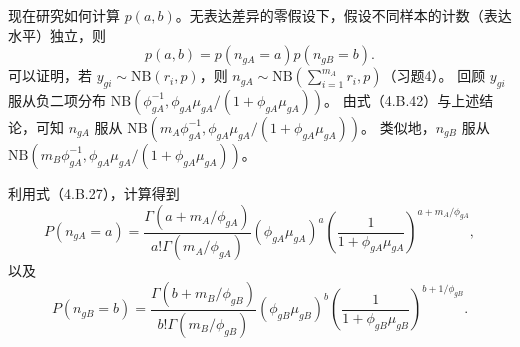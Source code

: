 现在研究如何计算 $p(a,b)$。无表达差异的零假设下，假设不同样本的计数（表达水平）独立，则
\[
p(a,b)=p(n_{gA}=a)p(n_{gB}=b).
\]
可以证明，若 $y_{gi}\sim\mathrm{NB}(r_i,p)$，则
$n_{gA}\sim\mathrm{NB}(\sum_{i=1}^{m_A}r_i,p)$（习题4）。
回顾 $y_{gi}$ 服从负二项分布
$\mathrm{NB}(\phi_{gA}^{-1},\phi_{gA}\mu_{gA}/(1+\phi_{gA}\mu_{gA}))$。
由式（4.B.42）与上述结论，可知 $n_{gA}$ 服从
$\mathrm{NB}(m_A\phi_{gA}^{-1},\phi_{gA}\mu_{gA}/(1+\phi_{gA}\mu_{gA}))$。
类似地，$n_{gB}$ 服从
$\mathrm{NB}(m_B\phi_{gA}^{-1},\phi_{gA}\mu_{gA}/(1+\phi_{gA}\mu_{gA}))$。

利用式（4.B.27），计算得到
\begin{equation}
P(n_{gA}=a)=\frac{\Gamma(a+m_A/\phi_{gA})}{a!\Gamma(m_A/\phi_{gA})}
(\phi_{gA}\mu_{gA})^a
\left(\frac1{1+\phi_{gA}\mu_{gA}}\right)^{a+m_A/\phi_{gA}},\tag{4.B.45}
\end{equation}
以及
\begin{equation}
P(n_{gB}=b)=\frac{\Gamma(b+m_B/\phi_{gB})}{b!\Gamma(m_B/\phi_{gB})}
(\phi_{gB}\mu_{gB})^b
\left(\frac1{1+\phi_{gB}\mu_{gB}}\right)^{b+1/\phi_{gB}}.\tag{4.B.46}
\end{equation}
